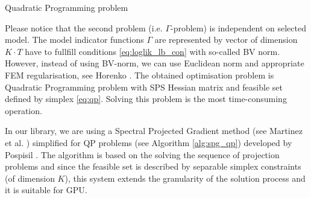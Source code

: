\documentclass[final,hyperref={pdfpagelabels=false}]{beamer}
\begin{document}
\begin{frame}[t]
\begin{columns}[t]
\begin{column}{.48\textwidth}
\begin{block}{Quadratic Programming problem}

Please notice that the second problem (i.e. $\Gamma$-problem) is independent on selected model. The model indicator functions $\Gamma$ are represented by vector of dimension $K \cdot T$
have to fullfill conditions \eqref{eq:loglik_lb_con} with so-called BV norm. However, instead of 
using BV-norm, we can use Euclidean norm and appropriate FEM regularisation, see Horenko \cite{horenko_fem}. The obtained optimisation problem is Quadratic Programming problem
with SPS Hessian matrix and feasible set defined by simplex \eqref{eq:qp}. Solving this problem is the most time-consuming operation.

In our library, we are using a Spectral Projected Gradient method (see Martinez et al. \cite{spg}) simplified for QP problems (see Algorithm \ref{alg:spg_qp}) developed by Pospisil \cite{pospisil_phd}.
The algorithm is based on the solving the sequence of projection problems and since the feasible set is described by separable simplex constraints (of dimension $K$),
this system extends the granularity of the solution process and it is suitable for GPU.


\end{block}
\end{column}
\end{columns}
\end{frame}
\end{document}
